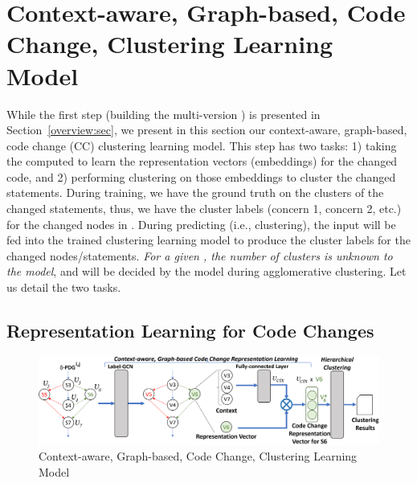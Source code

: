 
\section{Context-aware, Graph-based, Code Change, Clustering Learning Model}
\label{clustering-model:sec}


While the first step (building the multi-version {\mvpdg}) is
presented in Section~\ref{overview:sec}, we present in this section
our context-aware, graph-based, code change (CC) clustering learning
model.  This step has two tasks: 1) taking the computed {\mvpdg} to
learn the representation vectors (embeddings) for the changed code,
and 2) performing clustering on those embeddings to cluster the
changed statements.  During training, we have the ground truth on the
clusters of the changed statements, thus, we have the cluster labels
(concern 1, concern 2, etc.) for the changed nodes in {\mvpdg}. During
predicting (i.e., clustering), the input {\mvpdg} will be fed into the
trained clustering learning model to produce the cluster labels for
the changed nodes/statements. {\em For a given {\mvpdg}, the number of
clusters is unknown to the model}, and will be decided by the model
during agglomerative clustering. Let us detail the two tasks.



\subsection{Representation Learning for Code Changes}
\label{vector:sec}

\begin{figure}[t]
	\centering \includegraphics[width=5.6in]{figures/STEP_2-new-3.png}
	\vspace{-6pt}
	\caption{Context-aware, Graph-based, Code Change, Clustering Learning Model}
	\label{fig:step-2}
\end{figure}


